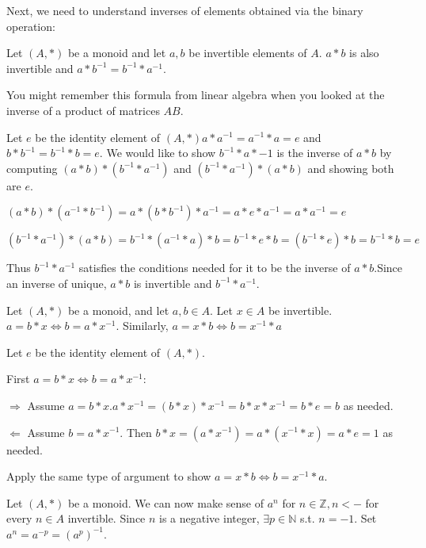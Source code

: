 \documentclass[10pt]{article}
\begin{document}
\begin{description}
		\item Next, we need to understand inverses of elements obtained via the binary operation:
		\item[Theorem:] Let $(A, *)$ be a monoid and let $a, b$ be invertible elements of $A$. $a*b$ is also invertible and $a*b^{-1} = b^{-1}*a^{-1}$.
		\begin{description}
			\item[Remark:] You might remember this formula from linear algebra when you looked at the inverse of a product of matrices $AB$.
			\item[Proof:] Let $e$ be the identity element of $(A, *)  a*a^{-1} = a^{-1}*a = e$ and $b * b^{-1} = b^{-1}*b = e$. We would like to show $b^{-1} * a*{-1}$ is the inverse of $a*b$ by computing $(a*b)*(b^{-1} * a^{-1})$ and $(b^{-1} * a^{-1}) * (a*b)$ and showing both are $e$.
			\item $(a*b)*(a^{-1}*b^{-1}) = a*(b*b^{-1})*a^{-1} = a*e*a^{-1} = a*a^{-1} = e$
			\item $(b^{-1}*a^{-1})*(a*b) = b^{-1}*(a^{-1}*a)*b = b^{-1}*e*b = (b^{-1}*e)*b = b^{-1}*b=e$
			\item Thus $b^{-1}*a^{-1}$ satisfies the conditions needed for it to be the inverse of $a*b$.Since an inverse of unique, $a*b$ is invertible and $b^{-1}*a^{-1}$.
		\end{description}
		\item[Theorem:] Let $(A, *)$ be a monoid, and let $a, b \in A$. Let $x \in A$ be invertible. $a=b*x \Leftrightarrow b = a*x^{-1}$. Similarly, $a=x*b \Leftrightarrow b = x^{-1}*a$
		\begin{description}
			\item[Proof:] Let $e$ be the identity element of $(A, *)$.
			\item First $a=b*x \Leftrightarrow b = a*x^{-1}$:
			\item $\Rightarrow$ Assume $a=b*x. a*x^{-1} = (b*x)*x^{-1} = b*{x*x^{-1}} = b*e = b$ as needed.
			\item $\Leftarrow$ Assume $b=a*x^{-1}$. Then $b*x=(a*x^{-1})=a*(x^{-1}*x)=a*e=1$ as needed.
			\item Apply the same type of argument to show $a=x*b \Leftrightarrow b=x^{-1}*a$.
			\item[qed]
		\end{description}
		\item Let $(A, *)$ be a monoid. We can now make sense of $a^n$ for $n \in \mathbb{Z}, n < -$ for every $n \in A$ invertible. Since $n$ is a negative integer, $\exists p \in \mathbb{N}$ s.t. $n=-1$. Set $a^n = a^{-p}=(a^p)^{-1}$.

\end{description}
\end{document}
